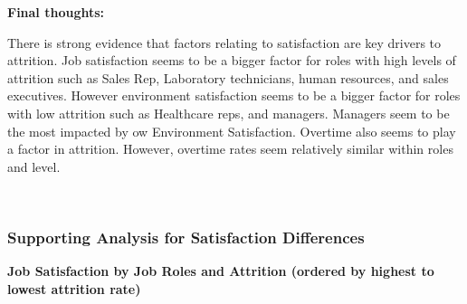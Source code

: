 \documentclass[
]{article}
\begin{document}
\textbf{Final thoughts:}

There is strong evidence that factors relating to satisfaction are key
drivers to attrition. Job satisfaction seems to be a bigger factor for
roles with high levels of attrition such as Sales Rep, Laboratory
technicians, human resources, and sales executives. However environment
satisfaction seems to be a bigger factor for roles with low attrition
such as Healthcare reps, and managers. Managers seem to be the most
impacted by ow Environment Satisfaction. Overtime also seems to play a
factor in attrition. However, overtime rates seem relatively similar
within roles and level.

~ ~

\hypertarget{supporting-analysis-for-satisfaction-differences}{%
\subsubsection{Supporting Analysis for Satisfaction
Differences}\label{supporting-analysis-for-satisfaction-differences}}

\textbf{Job Satisfaction by Job Roles and Attrition (ordered by highest
to lowest attrition rate)}
\end{document}
